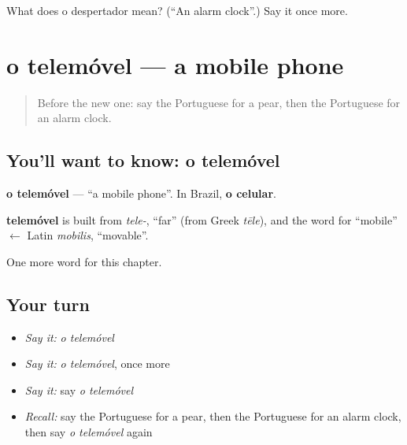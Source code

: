 \begin{tcolorbox}[breakable,colback=teal!4,colframe=teal!35!black,title={Before you move on}]
What does o despertador mean? (\textquotedblleft{}An alarm clock\textquotedblright{}.) Say it once more.
\end{tcolorbox}
\section[o telemóvel]{o telemóvel — a mobile phone}

\label{lesson:PT-C100-telemovel}



\begin{quote}
Before the new one: say the Portuguese for a pear, then the Portuguese for an alarm clock.
\end{quote}

\subsection*{You'll want to know: o telemóvel}
\textbf{o telemóvel} — \textquotedblleft{}a mobile phone\textquotedblright{}. In Brazil, \textbf{o celular}.

\begin{cousinweb}
\textbf{telemóvel} is built from \emph{tele-}, \textquotedblleft{}far\textquotedblright{} (from Greek \emph{tēle}), and the word for \textquotedblleft{}mobile\textquotedblright{} $\leftarrow$ Latin \emph{mobilis}, \textquotedblleft{}movable\textquotedblright{}.
\end{cousinweb}

\begin{grammarlens}[title={What you've built}]
One more word for this chapter.
\end{grammarlens}

\subsection*{Your turn}
\begin{itemize}
\raggedright
  \item \emph{Say it:} \emph{o telemóvel}
  \item \emph{Say it:} \emph{o telemóvel}, once more
  \item \emph{Say it:} say \emph{o telemóvel}
  \item \emph{Recall:} say the Portuguese for a pear, then the Portuguese for an alarm clock, then say \emph{o telemóvel} again
\end{itemize}

